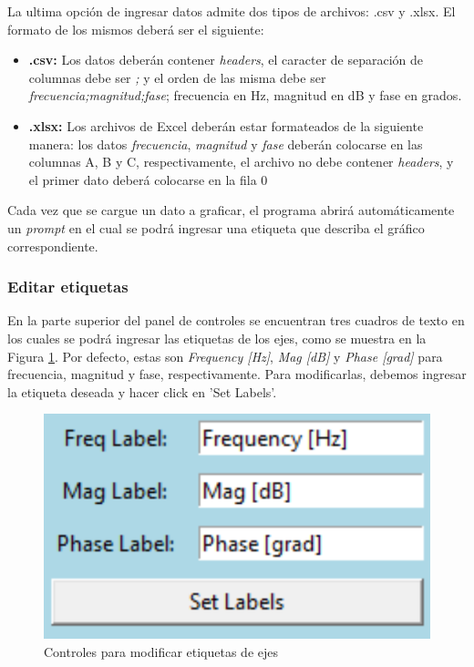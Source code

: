 La ultima opción de ingresar datos admite dos tipos de archivos: .csv y .xlsx. El formato de los mismos deberá ser el siguiente:
\begin{itemize}
\item \textbf{.csv: }Los datos deberán contener \emph{headers}, el caracter de separación de columnas debe ser \emph{;} y el orden de las misma debe ser \emph{frecuencia;magnitud;fase}; frecuencia en Hz, magnitud en dB y fase en grados.
\item \textbf{.xlsx: }Los archivos de Excel deberán estar formateados de la siguiente manera: los datos \emph{frecuencia}, \emph{magnitud} y \emph{fase} deberán colocarse en las columnas A, B y C, respectivamente, el archivo no debe contener \emph{headers}, y el primer dato deberá colocarse en la fila 0
\end{itemize}

Cada vez que se cargue un dato a graficar, el programa abrirá automáticamente un \emph{prompt} en el cual se podrá ingresar una etiqueta que describa el gráfico correspondiente.

\subsubsection{Editar etiquetas}

En la parte superior del panel de controles se encuentran tres cuadros de texto en los cuales se podrá ingresar las etiquetas de los ejes, como se muestra en la Figura \ref{fig:labesControl}. Por defecto, estas son \emph{Frequency [Hz]}, \emph{Mag [dB]} y \emph{Phase [grad]} para frecuencia, magnitud y fase, respectivamente. Para modificarlas, debemos ingresar la etiqueta deseada y hacer click en 'Set Labels'.

\begin{figure}[ht]
\centering
\includegraphics[scale=0.3]{resources/labelsControl.png}
\caption{Controles para modificar etiquetas de ejes}
\label{fig:labesControl}
\end{figure}

